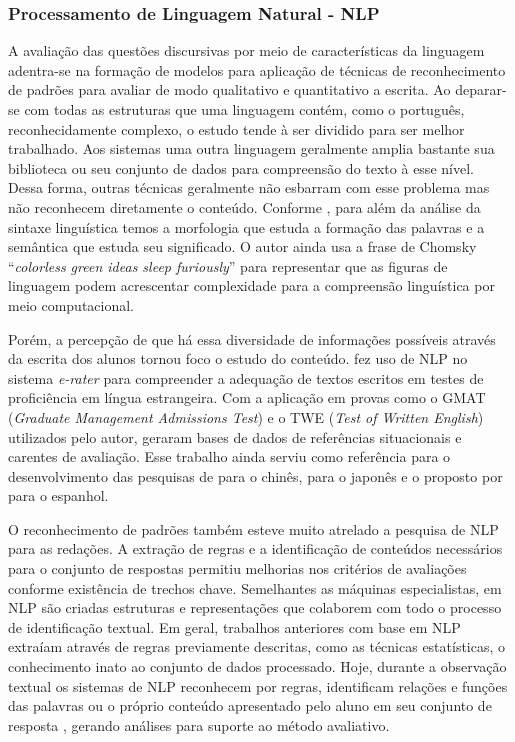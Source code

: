\subsubsection{Processamento de Linguagem Natural - NLP} \label{ss:NLP}
A avaliação das questões discursivas por meio de características da linguagem adentra-se na formação de modelos para aplicação de técnicas de reconhecimento de padrões para avaliar de modo qualitativo e quantitativo a escrita. Ao deparar-se com todas as estruturas que uma linguagem contém, como o português, reconhecidamente complexo, o estudo tende à ser dividido para ser melhor trabalhado. Aos sistemas uma outra linguagem geralmente amplia bastante sua biblioteca ou seu conjunto de dados para compreensão do texto à esse nível. Dessa forma, outras técnicas geralmente não esbarram com esse problema mas não reconhecem diretamente o conteúdo. Conforme , para além da análise da sintaxe linguística temos a morfologia que estuda a formação das palavras e a semântica que estuda seu significado. O autor ainda usa a frase de Chomsky ``\textit{colorless green ideas sleep furiously}'' para representar que as figuras de linguagem podem acrescentar complexidade para a compreensão linguística por meio computacional.

Porém, a percepção de que há essa diversidade de informações possíveis através da escrita dos alunos tornou foco o estudo do conteúdo.  fez uso de NLP no sistema \textit{e-rater} para compreender a adequação de textos escritos em testes de proficiência em língua estrangeira. Com a aplicação em provas como o GMAT (\textit{Graduate Management Admissions Test}) e o TWE (\textit{Test of Written English}) utilizados pelo autor, geraram bases de dados de referências situacionais e carentes de avaliação. Esse trabalho ainda serviu como referência para o desenvolvimento das pesquisas de  para o chinês,  para o japonês e o proposto por  para o espanhol.


O reconhecimento de padrões também esteve muito atrelado a pesquisa de NLP para as redações. A extração de regras e a identificação de conteúdos necessários para o conjunto de respostas permitiu melhorias nos critérios de avaliações conforme existência de trechos chave. Semelhantes as máquinas especialistas, em NLP são criadas estruturas e representações que colaborem com todo o processo de identificação textual. Em geral, trabalhos anteriores com base em NLP extraíam através de regras previamente descritas, como as técnicas estatísticas, o conhecimento inato ao conjunto de dados processado. Hoje, durante a observação textual os sistemas de NLP reconhecem por regras, identificam relações e funções das palavras \cite{pulman2005} ou o próprio conteúdo apresentado pelo aluno em seu conjunto de resposta \cite{cutrone2011}, gerando análises para suporte ao método avaliativo.


